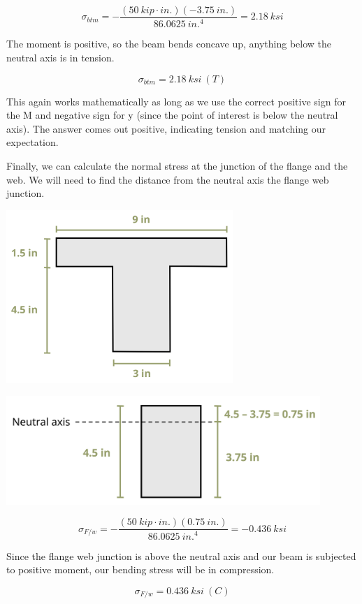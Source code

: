 \documentclass[
  letterpaper,
  DIV=11,
  numbers=noendperiod]{scrreprt}
\begin{document}
\begin{tcolorbox}
\begin{tcolorbox}
\[
\sigma_{btm}=-\frac{(50{~kip}\cdot{in.})(-3.75{~in.})}{86.0625{~in.}^4}=2.18{~ksi}
\]

The moment is positive, so the beam bends concave up, anything below the
neutral axis is in tension.

\[
\sigma_{btm}=2.18{~ksi}~(T)
\]

This again works mathematically as long as we use the correct positive
sign for the M and negative sign for y (since the point of interest is
below the neutral axis). The answer comes out positive, indicating
tension and matching our expectation.

Finally, we can calculate the normal stress at the junction of the
flange and the web. We will need to find the distance from the neutral
axis the flange web junction.

\begin{center}
\includegraphics[width=3.375in,height=\textheight]{images/CH9 PNGs/Example 9.1 part 5.png}
\end{center}

\begin{center}
\includegraphics[width=4.67708in,height=\textheight]{images/CH9 PNGs/Example 9.1 part 6.png}
\end{center}

\[
\sigma_{F / w}=-\frac{(50{~kip}\cdot{in.})(0.75{~in.})}{86.0625{~in.}^4}=-0.436{~ksi}
\]

Since the flange web junction is above the neutral axis and our beam is
subjected to positive moment, our bending stress will be in compression.

\[
\sigma_{F/w}=0.436{~ksi}~(C)
\]

\end{tcolorbox}

\end{tcolorbox}
\end{document}
